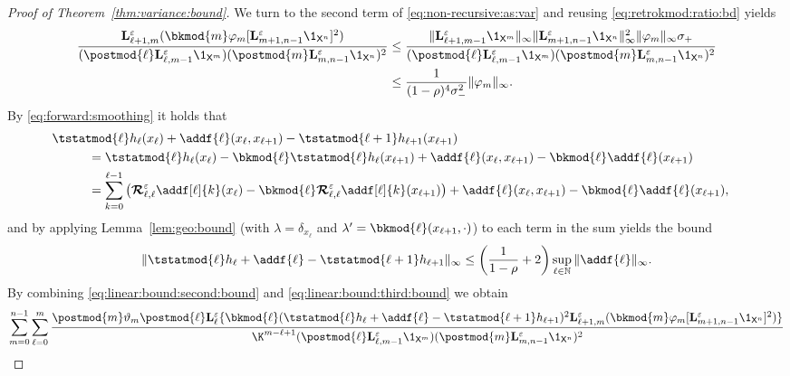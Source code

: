 \begin{proof}[Proof of Theorem~\ref{thm:variance:bound}]
We turn to the second term of \eqref{eq:non-recursive:as:var} and reusing \eqref{eq:retrokmod:ratio:bd} yields 
\begin{align} 
\frac{\ukmod{\ell + 1, m}( \bkmod{m} \varphi_m [\ukmod{m + 1, n - 1} \1_{\Xset^n}]^2)}{(\postmod{\ell} \ukmod{\ell, m - 1} \1_{\Xset^m})(\postmod{m} \ukmod{m, n - 1} \1_{\Xset^n})^2} 
&\leq \frac{\| \ukmod{\ell + 1, m - 1} \1_{\Xset^m} \|_\infty \|\ukmod{m + 1, n - 1} \1_{\Xset^n} \|_\infty^2 \|\varphi_m \|_\infty \udup}{(\postmod{\ell} \ukmod{\ell, m - 1} \1_{\Xset^m})(\postmod{m} \ukmod{m, n - 1} \1_{\Xset^n})^2} \nonumber \\ 
&\leq \frac{1}{(1 - \rho)^4 \udlow^2} 
\|\varphi_m \|_\infty. \label{eq:linear:bound:second:bound}
\end{align}
By \eqref{eq:forward:smoothing} it holds that  
\begin{align*}
\lefteqn{\tstatmod{\ell} h_{\ell}(x_\ell) + \addf{\ell}(x_\ell, x_{\ell + 1}) - \tstatmod{\ell + 1} h_{\ell +1}(x_{\ell + 1})} \hspace{10mm} \\ 
&= \tstatmod{\ell} h_\ell(x_\ell) - \bkmod{\ell}\tstatmod{\ell} h_\ell(x_{\ell + 1}) + \addf{\ell}(x_\ell, x_{\ell + 1}) - \bkmod{\ell} \addf{\ell}(x_{\ell + 1}) \\
&= \sum_{k = 0}^{\ell - 1} \left( \retrokmodmod_{\ell, \ell} \addf[\ell]{k}(x_\ell) - \bkmod{\ell} \retrokmodmod_{\ell, \ell} \addf[\ell]{k}(x_{\ell + 1}) \right) + \addf{\ell}(x_\ell, x_{\ell + 1}) - \bkmod{\ell} \addf{\ell}(x_{\ell + 1}), 
\end{align*}
and by applying Lemma~\ref{lem:geo:bound} (with $\lambda = \delta_{x_\ell}$ and $\lambda' = \bkmod{\ell}(x_{\ell + 1}, \cdot)$) to each term in the sum yields the bound 
\begin{equation} \label{eq:linear:bound:third:bound}
\| \tstatmod{\ell} h_{\ell} + \addf{\ell} - \tstatmod{\ell + 1} h_{\ell +1} \|_\infty \leq \left( \frac{1}{1 - \rho} + 2 \right) \sup_{\ell \in \nset} \|\addf{\ell} \|_\infty. 
\end{equation}
By combining \eqref{eq:linear:bound:second:bound} and \eqref{eq:linear:bound:third:bound} we obtain 
\begin{multline} 
 \sum_{m = 0}^{n - 1} \sum_{\ell = 0}^m \frac{\postmod{m} \adjfuncforward{m} \postmod{\ell} \ukmod{\ell} \{\bkmod{\ell}(\tstatmod{\ell} h_{\ell} + \addf{\ell} - \tstatmod{\ell + 1} h_{\ell +1})^2 \ukmod{\ell + 1, m}( \bkmod{m} \varphi_m [\ukmod{m + 1, n - 1} \1_{\Xset^n}]^2
)\}}{\K^{m - \ell + 1} (\postmod{\ell} \ukmod{\ell, m - 1} \1_{\Xset^m})(\postmod{m} \ukmod{m, n - 1} \1_{\Xset^n})^2} \\

\end{multline}
\end{proof}
